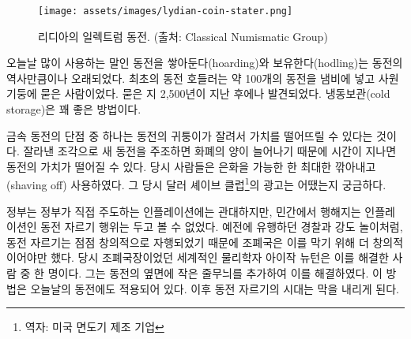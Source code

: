 \newpage

\begin{figure}
	\centering
	\texttt{[image: assets/images/lydian-coin-stater.png]}
	\caption{리디아의 일렉트럼 동전. (출처: Classical Numismatic Group)}
	\label{fig:lydian-coin-stater}
\end{figure}

\begin{comment}
	Turns out that hoarding coins, or hodling, to use today's parlance, is
	almost as old as coins. The earliest coin hodler was someone who put
	almost a hundred of these coins in a pot and buried it in the
	foundations of a temple, only to be found 2500 years later. Pretty good
	cold storage if you ask me.
\end{comment}
오늘날 많이 사용하는 말인 동전을 쌓아둔다(hoarding)와 보유한다(hodling)는 
동전의 역사만큼이나 오래되었다.
최초의 동전 호들러는 약 100개의 동전을 냄비에 넣고 사원 기둥에 묻은 사람이었다. 
묻은 지 2,500년이 지난 후에나 발견되었다.
냉동보관(cold storage)은 꽤 좋은 방법이다.

\begin{comment}
	One of the downsides of using precious metal coins is that they can be
	clipped, effectively debasing the value of the coin. New coins can be
	minted from the clippings, inflating the money supply over time,
	devaluing every individual coin in the process. People were literally
	shaving off as much as they could get away with of their silver dollars.
	I wonder what kind of \textit{Dollar Shave Club} advertisements they had back
	in the day.
\end{comment}
금속 동전의 단점 중 하나는 동전의 귀퉁이가 잘려서 가치를 떨어뜨릴 수 있다는 것이다. 
잘라낸 조각으로 새 동전을 주조하면 화폐의 양이 늘어나기 때문에 시간이 지나면 동전의 가치가 떨어질 수 있다.
당시 사람들은 은화을 가능한 한 최대한 깎아내고(shaving off) 사용하였다.
그 당시 달러 셰이브 클럽\footnote{역자: 미국 면도기 제조 기업}의 광고는 어땠는지 궁금하다.

\begin{comment}
	Since governments are only cool with inflation if they are the ones
	doing it, efforts were made to stop this guerrilla debasement. In
	classic cops-and-robbers fashion, coin clippers got ever more creative
	with their techniques, forcing the \enquote{masters of the mint} to get even
	more creative with their countermeasures. Isaac Newton, the
	world-renowned physicist of \textit{Principia Mathematica} fame, used to be one
	of these masters. He is attributed with adding the small stripes at the
	side of coins which are still present today. Gone were the days of easy
	coin shaving.
\end{comment}
정부는 정부가 직접 주도하는 인플레이션에는 관대하지만, 
민간에서 행해지는 인플레이션인 동전 자르기 행위는 두고 볼 수 없었다. 
예전에 유행하던 경찰과 강도 놀이처럼, 
동전 자르기는 점점 창의적으로 자행되었기 때문에 조폐국은 이를 막기 위해 더 창의적이어야만 했다.
당시 조폐국장이었던 세계적인 물리학자 아이작 뉴턴은 이를 해결한 사람 중 한 명이다. 
그는 동전의 옆면에 작은 줄무늬를 추가하여 이를 해결하였다. 
이 방법은 오늘날의 동전에도 적용되어 있다. 
이후 동전 자르기의 시대는 막을 내리게 된다.

